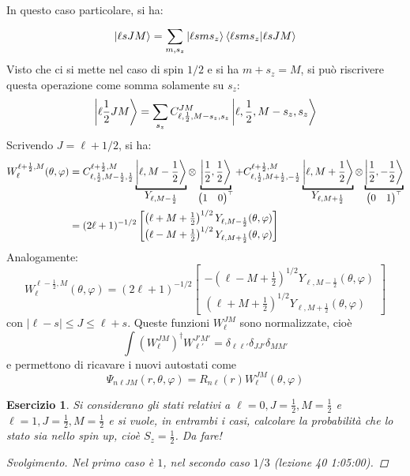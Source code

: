 \documentclass[11pt, a4paper]{scrartcl} %
\numberwithin{equation}{subsection}
\theoremstyle{style2}
\theoremstyle{style1}
\newtheorem{esercizio}{Esercizio}[section]
\renewcommand\qedsymbol{$\blacksquare$}
\newenvironment{svolgimento}{\renewcommand\qedsymbol{$\spadesuit$}\begin{proof}[Svolgimento]}{\end{proof}}
\begin{document}
In questo caso particolare, si ha:
\[
\ket{\ell s J M} = \sum_{m,s_z}^{} \ket{\ell sms_z} \braket{\ell sms_z|\ell sJM} 
\] 
Visto che ci si mette nel caso di spin $1 / 2$ e si ha $m + s_z = M$, si pu\`o riscrivere questa operazione come somma solamente su $s_z$:
\[
\Ket{\ell \frac{1}{2} JM } = \sum_{s_z}^{} C^{JM} _{\ell, \frac{1}{2}, M-s_z, s_z} \Ket{\ell ,\frac{1}{2},M-s_z, s_z} 
\] 
Scrivendo $J = \ell  +1 / 2$, si ha: 
\begin{equation}
	\begin{split}
		W^{\ell  + \frac{1}{2} , M} _{\ell }(\theta ,\varphi ) &= C^{\ell +\frac{1}{2 }, M} _{\ell , \frac{1}{2}, M - \frac{1}{2}, \frac{1}{2}} \underbracket{\Ket{\ell , M- \frac{1}{2}} }_{\displaystyle Y_{\ell , M - \frac{1}{2}} } \otimes \underbracket{\Ket{\frac{1}{2}, \frac{1}{2}} }_{\begin{pmatrix} 1& 0 \end{pmatrix}^\top } + C^{\ell  +\frac{1}{2}, M} _{\ell , \frac{1}{2}, M+\frac{1}{2}, -\frac{1}{2}} \underbracket{\Ket{\ell , M+\frac{1}{2}} }_{\displaystyle Y_{\ell , M +\frac{1}{2}} } \otimes \underbracket{\Ket{\frac{1}{2}, - \frac{1}{2}} }_{\begin{pmatrix} 0 & 1 \end{pmatrix}^\top } \\
		&= (2 \ell +1)^{- 1 / 2} \begin{bmatrix} \left(\ell +M+\frac{1}{2}\right) ^{ 1 / 2} Y_{\ell ,  M - \frac{1}{2}} (\theta ,\varphi )\\ \left(\ell -M+ \frac{1}{2}\right)^{1 /2}  Y_{\ell ,M+\frac{1}{2}} (\theta ,\varphi ) \end{bmatrix} 
	\end{split}
\end{equation}
Analogamente:
\begin{equation}
W^{\ell - \frac{1}{2}, M} _{\ell } (\theta ,\varphi ) =  (2 \ell +1)^{- 1 / 2} \begin{bmatrix} - \left(\ell -M+\frac{1}{2}\right) ^{ 1 / 2} Y_{\ell ,  M - \frac{1}{2}} (\theta ,\varphi )\\ \left(\ell +M+ \frac{1}{2}\right)^{1 /2}  Y_{\ell ,M+\frac{1}{2}} (\theta ,\varphi ) \end{bmatrix} 
\end{equation}
con $\lvert \ell -s \rvert \le J\le \ell +s$. Queste funzioni $W^{JM} _{\ell } $ sono normalizzate, cio\`e
\[
\int \left(W^{JM} _\ell\right)^\dagger   W_{\ell '}^{J'M'}  = \delta _{\ell \ell '} \delta _{JJ'} \delta _{MM'} 
\] 
e permettono di ricavare i nuovi autostati come 
\begin{equation}
	\Psi_{n\ell JM} (r,\theta,\varphi ) = R_{n\ell } (r) W_{\ell } ^{JM} (\theta ,\varphi )
\end{equation}
\begin{esercizio}
Si considerano gli stati relativi a $\ell =0, J = \frac{1}{2}, M =\frac{1}{2}$ e $\ell =1, J =\frac{1}{2}, M=\frac{1}{2}$ e si vuole, in entrambi i casi, calcolare la probabilit\`a che lo stato sia nello spin up, cio\`e $S_z  = \frac{1}{2}$.
{\color{red} Da fare!}
\begin{svolgimento}
	Nel primo caso \`e $1$, nel secondo caso $1 / 3$ (lezione 40 1:05:00). 
\end{svolgimento}
\end{esercizio}
\end{document}
